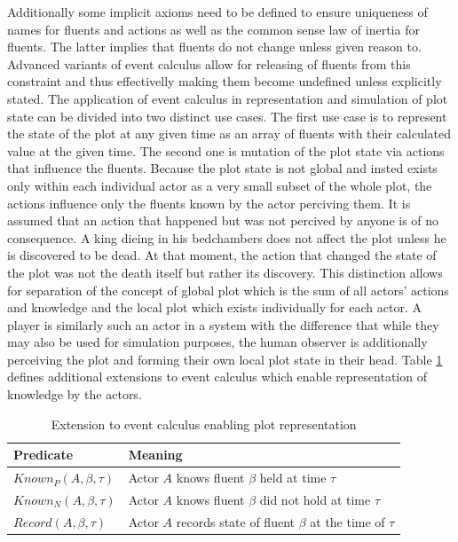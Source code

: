 Additionally some implicit axioms need to be defined to ensure uniqueness of names for fluents and actions as well as the common sense law of inertia for fluents.
The latter implies that fluents do not change unless given reason to.
Advanced variants of event calculus allow for releasing of fluents from this constraint and thus effectivelly making them become undefined unless explicitly stated.
The application of event calculus in representation and simulation of plot state can be divided into two distinct use cases.
The first use case is to represent the state of the plot at any given time as an array of fluents with their calculated value at the given time.
The second one is mutation of the plot state via actions that influence the fluents.
Because the plot state is not global and insted exists only within each individual actor as a very small subset of the whole plot, the actions influence only the fluents known by the actor perciving them.
It is assumed that an action that happened but was not percived by anyone is of no consequence.
A king dieing in his bedchambers does not affect the plot unless he is discovered to be dead.
At that moment, the action that changed the state of the plot was not the death itself but rather its discovery.
This distinction allows for separation of the concept of global plot which is the sum of all actors' actions and knowledge and the local plot which exists individually for each actor.
A player is similarly such an actor in a system with the difference that while they may also be used for simulation purposes, the human observer is additionally perceiving the plot and forming their own local plot state in their head.
Table \ref{tab:event-calculus-plot-predicates} defines additional extensions to event calculus which enable representation of knowledge by the actors.

\begin{table}[]
    \centering
    \begin{tabular}{@{}ll@{}}
        \toprule
        Predicate                               & Meaning                                                         \\ \midrule
        $Known_P \left( A, \beta, \tau \right)$ & Actor $A$ knows fluent $\beta$ held at time $\tau$              \\
        $Known_N \left( A, \beta, \tau \right)$ & Actor $A$ knows fluent $\beta$ did not hold at time $\tau$      \\
        $Record \left( A, \beta, \tau \right)$  & Actor $A$ records state of fluent $\beta$ at the time of $\tau$ \\ \bottomrule
    \end{tabular}
    \caption{Extension to event calculus enabling plot representation}
    \label{tab:event-calculus-plot-predicates}
\end{table}

